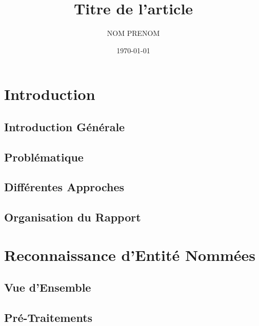 \documentclass[11pt,a4paper]{report}
\title{Titre de l'article}
\date{\today}
\author{NOM PRENOM}
\begin{document}



%	

%	


\tableofcontents
%	



\chapter{Introduction}
	\section{Introduction Générale}
		
	\section{Problématique}
		
	\section{Différentes Approches}
		
	\section{Organisation du Rapport}
		

  	
\chapter{Reconnaissance d'Entité Nommées}
	\section{Vue d'Ensemble}
		
	\section{Pré-Traitements}
		
\end{document}
